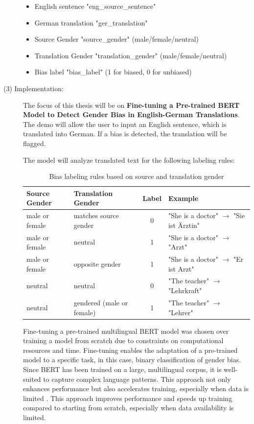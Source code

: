 \documentclass[oneside, paper=A4, DIV=15]{scrartcl}
\begin{document}
\begin{description}
\begin{itemize}
    \item English sentence "eng\_source\_sentence"
    \item German translation "ger\_translation"
    \item Source Gender "source\_gender" (male/female/neutral)
    \item Translation Gender "translation\_gender" (male/female/neutral)
    \item Bias label "bias\_label" (1 for biased, 0 for unbiased)
\end{itemize}


\item[(3) Implementation:]

The focus of this thesis will be on \textbf{Fine-tuning a Pre-trained BERT Model to Detect Gender Bias in English-German Translations}. The demo will allow the user to input an English sentence, which is translated into German. If a bias is detected, the translation will be flagged. 

The model will analyze translated text for the following labeling rules:

\begin{table}[h]
\centering
\begin{tabular}{llc l}
\toprule
\textbf{Source Gender} & \textbf{Translation Gender} & \textbf{Label} & \textbf{Example} \\
\midrule
male or female & matches source gender & 0 & "She is a doctor" $\rightarrow$ "Sie ist Ärztin" \\
male or female & neutral & 1 & "She is a doctor" $\rightarrow$ "Arzt" \\
male or female & opposite gender & 1 & "She is a doctor" $\rightarrow$ "Er ist Arzt" \\
neutral & neutral & 0 & "The teacher" $\rightarrow$ "Lehrkraft" \\
neutral & gendered (male or female) & 1 & "The teacher" $\rightarrow$ "Lehrer" \\
\bottomrule
\end{tabular}
\caption{Bias labeling rules based on source and translation gender}
\label{tab:bias_labeling_rules}
\end{table}

Fine-tuning a pre-trained multilingual BERT model was chosen over training a model from scratch due to constraints on computational resources and time. Fine-tuning enables the adaptation of a pre-trained model to a specific task, in this case, binary classification of gender bias. Since BERT has been trained on a large, multilingual corpus, it is well-suited to capture complex language patterns. This approach not only enhances performance but also accelerates training, especially when data is limited \parencite{devlin_bert_2019}. This approach improves performance and speeds up training compared to starting from scratch, especially when data availability is limited.


\end{description}
\end{document}
